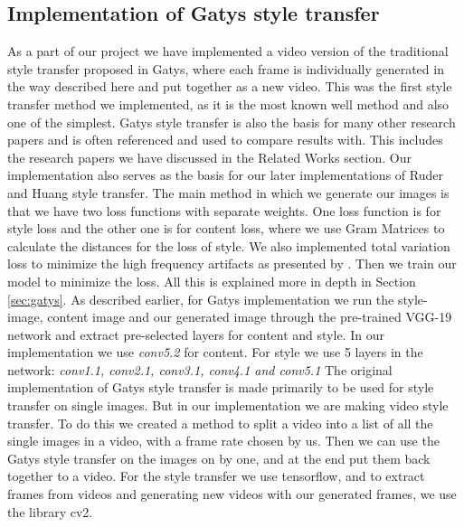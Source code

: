 \subsection{Implementation of Gatys style transfer}
As a part of our project we have implemented a video version of the traditional style transfer proposed in Gatys\cite{Gatys:1}, where each frame is individually generated in the way described here and put together as a new video.\newline\newline
This was the first style transfer method we implemented, as it is the most known well method and also one of the simplest. Gatys style transfer is also the basis for many other research papers and is often referenced and used to compare results with. This includes the research papers we have discussed in the Related Works section. Our implementation also serves as the basis for our later implementations of Ruder \cite{Ruder:1} and Huang \cite{Huang:1} style transfer.  \newline\newline
The main method in which we generate our images is that we have two loss functions with separate weights. One loss function is for style loss and the other one is for content loss, where we use Gram Matrices to calculate the distances for the loss of style. We also implemented total variation loss to minimize the high frequency artifacts as presented by \cite{Zhaoyou:1}. Then we train our model to minimize the loss. All this is explained more in depth in Section \ref{sec:gatys}.\newline\newline
As described earlier, for Gatys implementation we run the style-image, content image and our generated image through the pre-trained VGG-19 network and extract pre-selected layers for content and style. In our implementation we use \textit{conv5.2} for content. For style we use 5 layers in the network: \textit{conv1.1, conv2.1, conv3.1, conv4.1 and conv5.1}\newline\newline
The original implementation of Gatys style transfer is made primarily to be used for style transfer on single images. But in our implementation we are making video style transfer. To do this we created a method to split a video into a list of all the single images in a video, with a frame rate chosen by us. Then we can use the Gatys style transfer on the images on by one, and at the end put them back together to a video. For the style transfer we use tensorflow, and to extract frames from videos and generating new videos with our generated frames, we use the library cv2.\newline\newline
